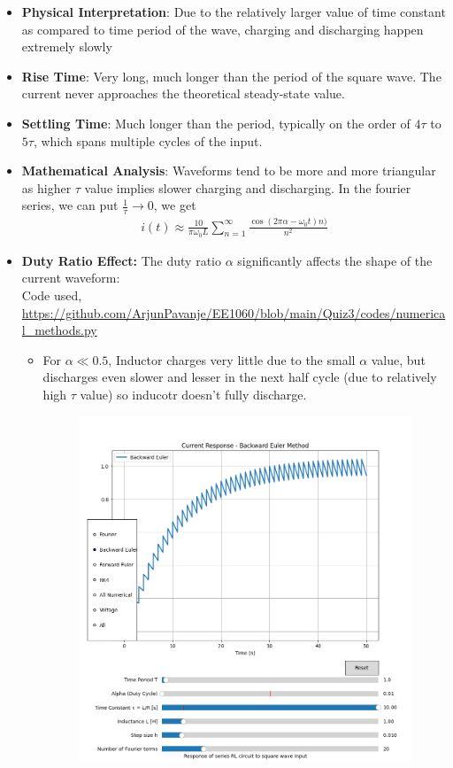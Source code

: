 \documentclass[12pt,a4paper]{report}
\begin{document}
\begin{itemize}
    \item \textbf{Physical Interpretation}: Due to the relatively larger value of time constant as compared to time period of the wave, charging and discharging happen extremely slowly
    \item \textbf{Rise Time}: Very long, much longer than the period of the square wave. The current never approaches the theoretical steady-state value.
    \item \textbf{Settling Time}: Much longer than the period, typically on the order of $4\tau$ to $5\tau$, which spans multiple cycles of the input.
    \item \textbf{Mathematical Analysis}: Waveforms tend to be more and more triangular as higher $\tau$ value implies slower charging and discharging. In the fourier series, we can put $\frac{1}{\tau} \rightarrow 0$, we get 
    \begin{align}
    i(t) \approx \frac{10}{\pi \omega_0 L} \sum_{n=1}^{\infty} \frac{\cos(2\pi \alpha - \omega_0 t)n)}{n^2}
    \end{align}
    \item \textbf{Duty Ratio Effect: } The duty ratio $\alpha$ significantly affects the shape of the current waveform:\\
    Code used, \url{https://github.com/ArjunPavanje/EE1060/blob/main/Quiz3/codes/numerical_methods.py}
    \begin{itemize}
        \item For $\alpha \ll 0.5$, Inductor charges very little due to the small $\alpha$ value, but discharges even slower and lesser in the next half cycle (due to relatively high $\tau$ value) so inducotr doesn't fully discharge.
        \pagebreak
        \begin{figure}[h!]
	\centering
	\includegraphics[scale=0.6]{figs/tau>>T-1.png}

\end{figure}
\end{itemize}
\end{itemize}
\end{document}
